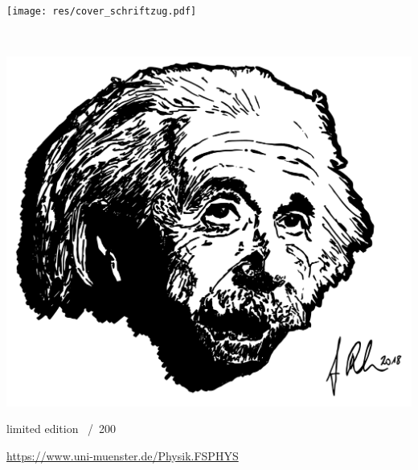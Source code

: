 \begin{titlepage}
	\begin{center}
		\vspace*{-1.25cm}
		{\LARGE
		\fibeltitel\par}

		\vspace{0.5cm}
		\texttt{[image: res/cover\_schriftzug.pdf]}

		{\huge
		\fibelsemester~\fibeljahr}

		\vspace{0.5cm}
		\includegraphics[width=\textwidth, height=0.53\textheight]{res/cover_einstein.pdf}
	\end{center}

	\LARGE
	limited edition \underline{\fontsize{32pt}{1em}}~/~200
	
	\vspace{1.9cm}
	\centering
	\url{https://www.uni-muenster.de/Physik.FSPHYS}
\end{titlepage}

